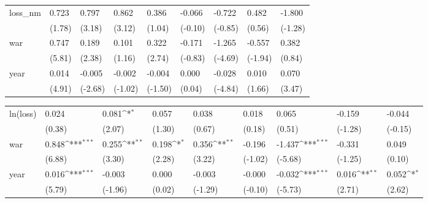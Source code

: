 \begin{tabular}{p{1.5cm} p{2cm} p{1.7cm} p{1.7cm} p{1.7cm} p{1.7cm} p{1.7cm} p{1.7cm} p{1.7cm}}
\hline
loss\_nm         &    0.723         &    0.797\sym{**} &    0.862\sym{**} &    0.386         &   -0.066         &   -0.722         &    0.482         &   -1.800         \\
                &   (1.78)         &   (3.18)         &   (3.12)         &   (1.04)         &  (-0.10)         &  (-0.85)         &   (0.56)         &  (-1.28)         \\
war             &    0.747\sym{***}&    0.189\sym{*}  &    0.101         &    0.322\sym{**} &   -0.171         &   -1.265\sym{***}&   -0.557         &    0.382         \\
                &   (5.81)         &   (2.38)         &   (1.16)         &   (2.74)         &  (-0.83)         &  (-4.69)         &  (-1.94)         &   (0.84)         \\
year            &    0.014\sym{***}&   -0.005\sym{**} &   -0.002         &   -0.004         &    0.000         &   -0.028\sym{***}&    0.010         &    0.070\sym{**} \\
                &   (4.91)         &  (-2.68)         &  (-1.02)         &  (-1.50)         &   (0.04)         &  (-4.84)         &   (1.66)         &   (3.47)         \\
\end{tabular}
\def\sym#1{\ifmmode^{#1}\else\(^{#1}\)\fi}
\begin{tabular}{p{1.5cm} p{2cm} p{1.7cm} p{1.7cm} p{1.7cm} p{1.7cm} p{1.7cm} p{1.7cm} p{1.7cm}}
\hline
ln(loss)        &    0.024         &    0.081\sym{*}  &    0.057         &    0.038         &    0.018         &    0.065         &   -0.159         &   -0.044         \\
                &   (0.38)         &   (2.07)         &   (1.30)         &   (0.67)         &   (0.18)         &   (0.51)         &  (-1.28)         &  (-0.15)         \\
war             &    0.848\sym{***}&    0.255\sym{**} &    0.198\sym{*}  &    0.356\sym{**} &   -0.196         &   -1.437\sym{***}&   -0.331         &    0.049         \\
                &   (6.88)         &   (3.30)         &   (2.28)         &   (3.22)         &  (-1.02)         &  (-5.68)         &  (-1.25)         &   (0.10)         \\
year            &    0.016\sym{***}&   -0.003         &    0.000         &   -0.003         &   -0.000         &   -0.032\sym{***}&    0.016\sym{**} &    0.052\sym{*}  \\
                &   (5.79)         &  (-1.96)         &   (0.02)         &  (-1.29)         &  (-0.10)         &  (-5.73)         &   (2.71)         &   (2.62)         \\
\end{tabular}
